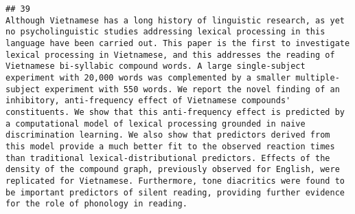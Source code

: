 \documentclass[
  english,
  man]{apa6}
\begin{document}
\begin{verbatim}
## 39                                                                                                                                                                                                                                                                                                                                                                                                                                                                                                                                                                                                                                                                                                                                                                                                                                                                                                                                                                                                                                                                                                                                                                                                                                                                                                                                                                                                                                                                                                                 Although Vietnamese has a long history of linguistic research, as yet no psycholinguistic studies addressing lexical processing in this language have been carried out. This paper is the first to investigate lexical processing in Vietnamese, and this addresses the reading of Vietnamese bi-syllabic compound words. A large single-subject experiment with 20,000 words was complemented by a smaller multiple-subject experiment with 550 words. We report the novel finding of an inhibitory, anti-frequency effect of Vietnamese compounds' constituents. We show that this anti-frequency effect is predicted by a computational model of lexical processing grounded in naive discrimination learning. We also show that predictors derived from this model provide a much better fit to the observed reaction times than traditional lexical-distributional predictors. Effects of the density of the compound graph, previously observed for English, were replicated for Vietnamese. Furthermore, tone diacritics were found to be important predictors of silent reading, providing further evidence for the role of phonology in reading.

\end{verbatim}
\end{document}
